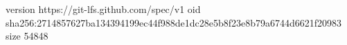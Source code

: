 version https://git-lfs.github.com/spec/v1
oid sha256:2714857627ba134394199ec44f988de1dc28e5b8f23e8b79a6744d6621f20983
size 54848
